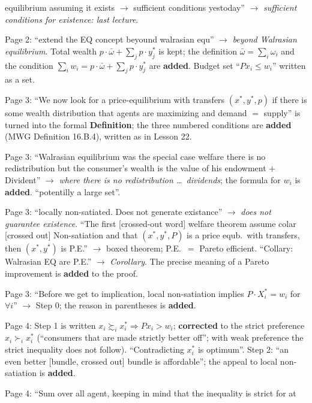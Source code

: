 \documentclass[11pt]{article}
\begin{document}
\begin{transcriptnotes}
        equilibrium assuming it exists $\to$ sufficient conditions yestoday'' $\to$
        \emph{sufficient conditions for existence: last lecture}.
  \item Page 2: ``extend the EQ concept beyound walrasian equ'' $\to$ \emph{beyond Walrasian
        equilibrium}. Total wealth $p\cdot\bar\omega+\sum_j p\cdot y_j^*$ is kept; the
        definition $\bar\omega=\sum_i\omega_i$ and the condition
        $\sum_i w_i=p\cdot\bar\omega+\sum_j p\cdot y_j^*$ are \textbf{added}. Budget set
        ``$Px_i\le w_i$'' written as a set.
  \item Page 3: ``We now look for a price-equilibrium with transfers $(x^*,y^*,p)$ if there is
        some wealth distribution that agents are maximizing and demand $=$ supply'' is turned
        into the formal \textbf{Definition}; the three numbered conditions are
        \textbf{added} (MWG Definition 16.B.4), written as in Lesson 22.
  \item Page 3: ``Walrasian equilibrium was the special case welfare there is no
        redistribution but the consumer's wealth is the value of his endowment $+$
        Divident'' $\to$ \emph{where there is no redistribution \dots\ dividends}; the
        formula for $w_i$ is \textbf{added}. ``potentilly a large set''.
  \item Page 3: ``locally non-satiated. Does not generate existance'' $\to$ \emph{does not
        guarantee existence}. ``The first [crossed-out word] welfare theorem assume colar
        [crossed out] Non-satiation and that $(x^*,y^*,P)$ is a price equb.\ with transfers,
        then $(x^*,y^*)$ is P.E.'' $\to$ boxed theorem; P.E.\ $=$ Pareto efficient.
        ``Collary: Walrasian EQ are P.E.'' $\to$ \emph{Corollary}. The precise meaning of a
        Pareto improvement is \textbf{added} to the proof.
  \item Page 3: ``Before we get to implication, local non-satiation implies $P\cdot X_i^*=w_i$
        for $\forall i$'' $\to$ Step 0; the reason in parentheses is \textbf{added}.
  \item Page 4: Step 1 is written $x_i\succsim_i x_i^*\Rightarrow Px_i>w_i$;
        \textbf{corrected} to the strict preference $x_i\succ_i x_i^*$ (``consumers that are
        made strictly better off''; with weak preference the strict inequality does not
        follow). ``Contradicting $x_i^*$ is optimum''. Step 2: ``an even better [bundle,
        crossed out] bundle is affordable''; the appeal to local non-satiation is
        \textbf{added}.
  \item Page 4: ``Sum over all agent, keeping in mind that the inequality is strict for at

\end{transcriptnotes}
\end{document}
